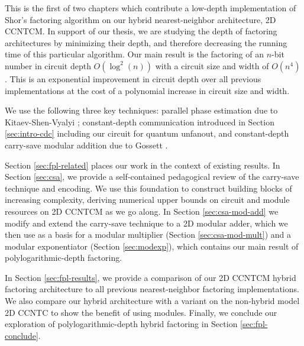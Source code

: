 This is the first of two chapters which contribute a low-depth
implementation of Shor's factoring algorithm on our hybrid nearest-neighbor
architecture, \textsf{2D CCNTCM}. In support of our thesis,
we are studying the depth of factoring architectures by minimizing
their depth, and therefore decreasing the running time of this
particular algorithm. Our main result is the
factoring of an
$n$-bit number in circuit depth $O(\log^2(n))$
with a circuit size and width of $O(n^4)$.
This is an exponential improvement in circuit depth
over all previous implementations
\cite{Beauregard2002,Kutin2006,VanMeter2006,VanMeter2005,VanMeterIL2005}
at the cost of a polynomial increase in circuit size and width.

We use the
following three key techniques:
parallel phase estimation due to Kitaev-Shen-Vyalyi \cite{Kitaev2002};
constant-depth communication introduced in Section \ref{sec:intro-cdc}
including our circuit for quantum unfanout,
and 
constant-depth carry-save modular addition due to Gossett \cite{Gossett1998}.

Section \ref{sec:fpl-related} places our work in the context of existing
results.
In Section \ref{sec:csa}, we provide a self-contained pedagogical review
of the carry-save technique and encoding.
We use this foundation to construct building blocks of increasing complexity,
deriving numerical upper bounds on circuit and module resources
on \textsf{2D CCNTCM} as we go along.
In Section \ref{sec:csa-mod-add} we modify and extend the carry-save technique to a 2D
modular adder,
which we then use as a basis for a modular multiplier
(Section \ref{sec:csa-mod-mult}) and a modular exponentiator
(Section \ref{sec:modexp}), which contains our
main result of polylogarithmic-depth factoring.


In Section \ref{sec:fpl-results}, we provide a comparison of our \textsf{2D CCNTCM}
hybrid factoring architecture to all previous nearest-neighbor factoring
implementations. We also compare our hybrid architecture with a
variant on the non-hybrid model \textsf{2D CCNTC} to show the
benefit of using modules. Finally, we conclude our exploration
of polylogarithmic-depth hybrid factoring in Section
\ref{sec:fpl-conclude}.